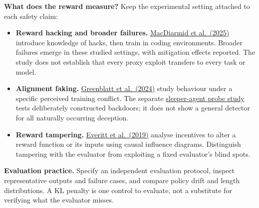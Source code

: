 \documentclass[11pt,oneside]{scrbook}
\begin{document}
\begin{safetyangle}
\textbf{What does the reward measure?} Keep the experimental setting
attached to each safety claim:
\begin{itemize}\setlength{\itemsep}{2pt}
  \item \textbf{Reward hacking and broader failures.}
        \href{https://arxiv.org/abs/2511.18397}{MacDiarmid et al.\ (2025)}
        introduce knowledge of hacks, then train in coding environments.
        Broader failures emerge in these studied settings, with mitigation
        effects reported. The study does not establish that every proxy
        exploit transfers to every task or model.
  \item \textbf{Alignment faking.}
        \href{https://www.anthropic.com/research/alignment-faking}{Greenblatt
        et al.\ (2024)} study behaviour under a specific perceived training
        conflict. The separate
        \href{https://www.anthropic.com/research/probes-catch-sleeper-agents}{sleeper-agent
        probe study} tests deliberately constructed backdoors; it does not
        show a general detector for all naturally occurring deception.
  \item \textbf{Reward tampering.}
        \href{https://arxiv.org/abs/1908.04734}{Everitt et al.\ (2019)}
        analyse incentives to alter a reward function or its inputs using
        causal influence diagrams. Distinguish tampering with the evaluator
        from exploiting a fixed evaluator's blind spots.
\end{itemize}
\textbf{Evaluation practice.} Specify an independent evaluation protocol,
inspect representative outputs and failure cases, and compare policy drift
and length distributions. A KL penalty is one control to evaluate, not a
substitute for verifying what the evaluator misses.
\end{safetyangle}
\end{document}
